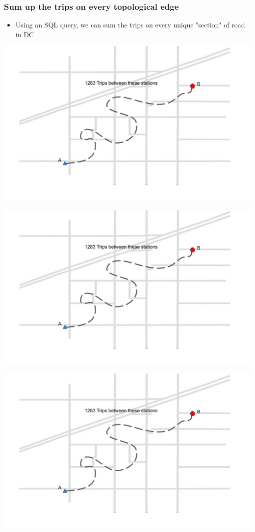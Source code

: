 \documentclass{beamer}
\begin{document}
\begin{frame}
    \frametitle{Sum up the trips on every topological edge}
    \begin{itemize}
        \item Using an SQL query, we can sum the trips on every unique "section" of road in DC

    \end{itemize}
\end{frame}
\begin{frame}
    \includegraphics[width=\textwidth,page=8]{graphics_document.pdf}
\end{frame}
\begin{frame}
    \includegraphics[width=\textwidth,page=9]{graphics_document.pdf}
\end{frame}
\begin{frame}
    \includegraphics[width=\textwidth,page=10]{graphics_document.pdf}
\end{frame}
\end{document}
